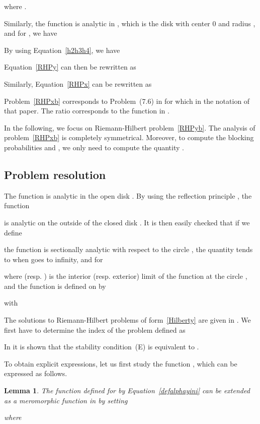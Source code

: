 \documentclass{amsart}
\newtheorem{lemma}{Lemma}[proposition]
\begin{document}
where .


Similarly, the function  is analytic in , which is the disk with center 0 and radius , and for , we have


By using Equation~\eqref{h2h3h4}, we have

Equation~\eqref{RHPy} can then be rewritten as


Similarly, Equation~\eqref{RHPx} can be rewritten as


Problem~\eqref{RHPxb} corresponds to Problem~(7.6) in \cite{FayolleIas} for which  in the notation of that paper. The ratio  corresponds to the function  in \cite{FayolleIas}.

In the following, we focus on Riemann-Hilbert problem~\eqref{RHPyb}. The analysis of problem~\eqref{RHPxb} is completely symmetrical. Moreover, to compute the blocking probabilities  and , we only need to compute the quantity .

\subsection{Problem resolution}

The function  is analytic in the open disk . By using the reflection principle \cite{Cartan}, the function 

is analytic on the outside of the closed disk . It is then easily checked that if we define 

the function  is sectionally analytic with respect to the circle ,  the quantity   tends to  when  goes to infinity, and for 

where  (resp. ) is the interior (resp. exterior) limit of the function  at the circle , and the function  is defined on  by

with


The solutions to Riemann-Hilbert problems of form~\eqref{Hilberty} are given in \cite{Lions}. We first have to determine the index of the problem defined as

In \cite[Theorem~7.2]{FayolleIas} it is shown that the stability condition~(E) is equivalent to .

To obtain explicit expressions, let us first study the function , which can be expressed as follows. 

\begin{lemma}
The function  defined for  by Equation~\eqref{defalphayini} can be extended as a meromorphic function in  by setting

where

\end{lemma}
\end{document}
